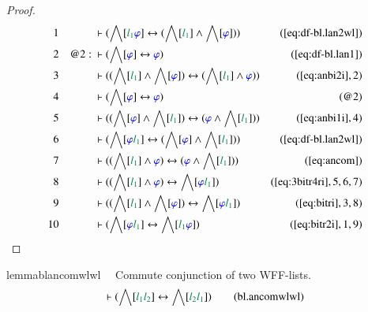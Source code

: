\begin{proof}
\begin{align}
  1 &&  & \vdash ( \bigwedge[ \mwl{l_1} \mw{\varphi} ] \leftrightarrow (
      \bigwedge[ \mwl{l_1} ] \wedge \bigwedge[ \mw{\varphi}
      ] ) )&(\mbox{\ref{eq:df-bl.lan2wl}})\notag
  \\ 2 && @2:\  & \vdash ( \bigwedge[ \mw{\varphi} ] \leftrightarrow
      \mw{\varphi} )&(\mbox{\ref{eq:df-bl.lan1}})\notag
  \\ 3 &&  & \vdash ( ( \bigwedge[ \mwl{l_1} ] \wedge \bigwedge[ \mw{\varphi} ]
      ) \leftrightarrow ( \bigwedge[ \mwl{l_1} ] \wedge
      \mw{\varphi} ) )&(\mbox{\ref{eq:anbi2i}},2)\notag
  \\ 4 &&  & \vdash ( \bigwedge[ \mw{\varphi} ] \leftrightarrow \mw{\varphi}
      )&(@2)\notag
  \\ 5 &&  & \vdash ( ( \bigwedge[ \mw{\varphi} ] \wedge \bigwedge[ \mwl{l_1} ]
      ) \leftrightarrow ( \mw{\varphi} \wedge \bigwedge[
      \mwl{l_1} ] ) )&(\mbox{\ref{eq:anbi1i}},4)\notag
  \\ 6 &&  & \vdash ( \bigwedge[ \mw{\varphi} \mwl{l_1} ] \leftrightarrow (
      \bigwedge[ \mw{\varphi} ] \wedge \bigwedge[ \mwl{l_1}
      ] ) )&(\mbox{\ref{eq:df-bl.lan2wl}})\notag
  \\ 7 &&  & \vdash ( ( \bigwedge[ \mwl{l_1} ] \wedge \mw{\varphi} )
      \leftrightarrow ( \mw{\varphi} \wedge \bigwedge[
      \mwl{l_1} ] ) )&(\mbox{\ref{eq:ancom}})\notag
  \\ 8 &&  & \vdash ( ( \bigwedge[ \mwl{l_1} ] \wedge \mw{\varphi} )
      \leftrightarrow \bigwedge[ \mw{\varphi} \mwl{l_1} ]
      )&(\mbox{\ref{eq:3bitr4ri}},5,6,7)\notag
  \\ 9 &&  & \vdash ( ( \bigwedge[ \mwl{l_1} ] \wedge \bigwedge[ \mw{\varphi} ]
      ) \leftrightarrow \bigwedge[ \mw{\varphi} \mwl{l_1} ]
      )&(\mbox{\ref{eq:bitri}},3,8)\notag
  \\ 10 &&  & \vdash ( \bigwedge[ \mw{\varphi} \mwl{l_1} ] \leftrightarrow
      \bigwedge[ \mwl{l_1} \mw{\varphi} ]
      )&(\mbox{\ref{eq:bitr2i}},1,9)\notag
\end{align}
\end{proof}

\begin{restatable}{lemma}{blancomwlwl}~~ Commute conjunction of two WFF-lists.
\begin{align}
\vdash ( \bigwedge[ \mwl{l_1} \mwl{l_2} ] \leftrightarrow \bigwedge[ \mwl{l_2}
    \mwl{l_1} ] )\label{eq:bl.ancomwlwl}\tag{bl.ancomwlwl}
\end{align}
\end{restatable}

